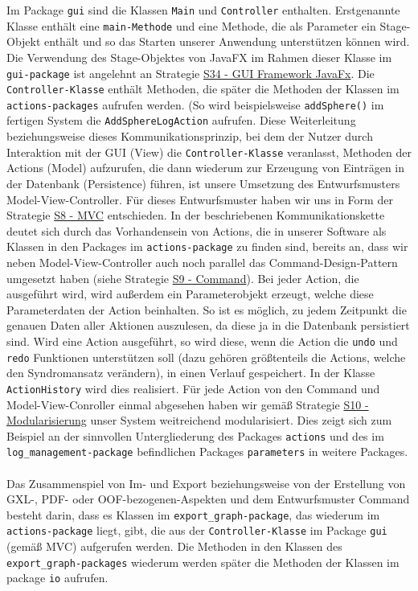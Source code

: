 \documentclass[enabledeprecatedfontcommands,fontsize=11pt,paper=a4,twoside]{scrartcl}
\newcounter{one}
\begin{document}
Im Package \texttt{gui} sind die Klassen \texttt{Main} und \texttt{Controller} enthalten. Erstgenannte Klasse enthält eine \texttt{main-Methode} und eine Methode, die als Parameter ein Stage-Objekt enthält und so das Starten unserer Anwendung unterstützen können wird. Die Verwendung des Stage-Objektes von JavaFX im Rahmen dieser Klasse im \texttt{gui-package} ist angelehnt an Strategie \hyperlink{kkk}{S34 - GUI Framework JavaFx}. Die \texttt{Controller-Klasse} enthält Methoden, die später die Methoden der Klassen im \texttt{actions-packages} aufrufen werden. (So wird beispielsweise \texttt{addSphere()} im fertigen System die \texttt{AddSphereLogAction} aufrufen. Diese Weiterleitung beziehungsweise dieses Kommunikationsprinzip, bei dem der Nutzer durch Interaktion mit der GUI (View) die \texttt{Controller-Klasse} veranlasst, Methoden der Actions (Model) aufzurufen, die dann wiederum zur Erzeugung von Einträgen in der Datenbank (Persistence) führen, ist unsere Umsetzung des Entwurfsmusters Model-View-Controller. Für dieses Entwurfsmuster haben wir uns in Form der Strategie \hyperlink{bbb}{S8 - MVC} entschieden. In der beschriebenen Kommunikationskette deutet sich durch das Vorhandensein von Actions, die in unserer Software als Klassen in den Packages im \texttt{actions-package} zu finden sind, bereits an, dass wir neben Model-View-Controller auch noch parallel das Command-Design-Pattern umgesetzt haben (siehe Strategie \hyperlink{xcc}{S9 - Command}). Bei jeder Action, die ausgeführt wird, wird außerdem ein Parameterobjekt erzeugt, welche diese Parameterdaten der Action beinhalten. So ist es möglich, zu jedem Zeitpunkt die genauen Daten aller Aktionen auszulesen, da diese ja in die Datenbank persistiert sind. Wird eine Action ausgeführt, so wird diese, wenn die Action die \texttt{undo} und \texttt{redo} Funktionen unterstützen soll (dazu gehören größtenteils die Actions, welche den Syndromansatz verändern), in einen Verlauf gespeichert. In der Klasse \texttt{ActionHistory} wird dies realisiert. Für jede Action von den Command und Model-View-Conroller einmal abgesehen haben wir gemäß Strategie \hyperlink{xdd}{S10 - Modularisierung} unser System weitreichend modularisiert. Dies zeigt sich zum Beispiel an der sinnvollen Untergliederung des Packages \texttt{actions} und des im \texttt{log\_management-package} befindlichen Packages \texttt{parameters} in weitere Packages.\\ \\

Das Zusammenspiel von Im- und Export beziehungsweise von der Erstellung von GXL-, PDF- oder OOF-bezogenen-Aspekten und dem Entwurfsmuster Command besteht darin, dass es Klassen im \texttt{export\_graph-package}, das wiederum im \texttt{actions-package} liegt, gibt, die aus der \texttt{Controller-Klasse} im Package \texttt{gui} (gemäß MVC) aufgerufen werden. Die Methoden in den Klassen des \texttt{export\_graph-packages} wiederum werden später die Methoden der Klassen im package \texttt{io} aufrufen. \\
\end{document}

